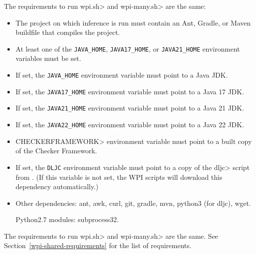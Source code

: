 
The requirements to run \<wpi.sh> and \<wpi-many.sh> are the same:

\begin{itemize}
\item The project on which inference is run must contain an Ant, Gradle,
  or Maven buildfile that compiles the project.
\item At least one of the \verb|JAVA_HOME|, \verb|JAVA17_HOME|,  or \verb|JAVA21_HOME|
  environment variables must be set.
\item If set, the \verb|JAVA_HOME| environment variable must point to a
  Java JDK.
\item If set, the \verb|JAVA17_HOME| environment variable must point to a Java 17 JDK.
\item If set, the \verb|JAVA21_HOME| environment variable must point to a Java 21 JDK.
\item If set, the \verb|JAVA22_HOME| environment variable must point to a Java 22 JDK.
\item \<CHECKERFRAMEWORK> environment variable must point to a built copy of the Checker Framework.
\item If set, the \verb|DLJC| environment variable must point to a copy of the \<dljc> script
from . (If this variable is not
set, the WPI scripts will download this dependency automatically.)
\item Other dependencies:
  ant,
  awk,
  curl,
  git,
  gradle,
  mvn,
  python3 (for dljc),
  wget.

  Python2.7 modules:
  subprocess32.
\end{itemize}




The requirements to run \<wpi.sh> and \<wpi-many.sh> are the same. See Section~\ref{wpi-shared-requirements}
for the list of requirements.

